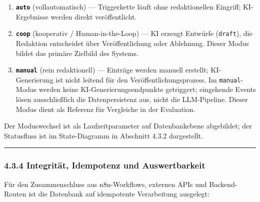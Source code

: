 \begin{enumerate}
\def\labelenumi{\arabic{enumi}.}
\tightlist
\item
  \textbf{\passthrough{\lstinline!auto!}} (vollautomatisch) ---
  Triggerkette läuft ohne redaktionellen Eingriff; KI-Ergebnisse werden
  direkt veröffentlicht.
\item
  \textbf{\passthrough{\lstinline!coop!}} (kooperativ /
  Human-in-the-Loop) --- KI erzeugt Entwürfe
  (\passthrough{\lstinline!draft!}), die Redaktion entscheidet über
  Veröffentlichung oder Ablehnung. Dieser Modus bildet das primäre
  Zielbild des Systems.
\item
  \textbf{\passthrough{\lstinline!manual!}} (rein redaktionell) ---
  Einträge werden manuell erstellt; KI-Generierung ist nicht leitend für
  den Veröffentlichungsprozess. Im
  \passthrough{\lstinline!manual!}-Modus werden keine
  KI-Generierungsendpunkte getriggert; eingehende Events lösen
  ausschließlich die Datenpersistenz aus, nicht die LLM-Pipeline. Dieser
  Modus dient als Referenz für Vergleiche in der Evaluation.
\end{enumerate}

Der Moduswechsel ist als Laufzeitparameter auf Datenbankebene
abgebildet; der Statusfluss ist im State-Diagramm in Abschnitt 4.3.2
dargestellt.

\begin{center}\rule{0.5\linewidth}{0.5pt}\end{center}

\subsubsection{4.3.4 Integrität, Idempotenz und
Auswertbarkeit}\label{integrituxe4t-idempotenz-und-auswertbarkeit}

Für den Zusammenschluss aus n8n-Workflows, externen APIs und
Backend-Routen ist die Datenbank auf idempotente Verarbeitung ausgelegt:

